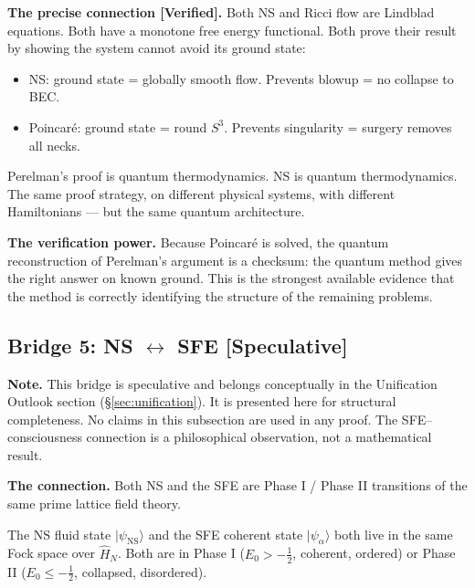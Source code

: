 \documentclass[12pt]{article}
\newcommand{\ket}[1]{|{#1}\rangle}
\newcommand{\half}{\tfrac{1}{2}}
\begin{document}
\begin{tcolorbox}[provedbox]
\textbf{The precise connection [Verified].}
Both NS and Ricci flow are Lindblad equations.
Both have a monotone free energy functional.
Both prove their result by showing the system cannot
avoid its ground state:
\begin{itemize}[itemsep=2pt]
  \item NS: ground state = globally smooth flow.
    Prevents blowup = no collapse to BEC.
  \item Poincar\'{e}: ground state = round $S^3$.
    Prevents singularity = surgery removes all necks.
\end{itemize}
Perelman's proof is quantum thermodynamics.
NS is quantum thermodynamics.
The same proof strategy, on different physical systems,
with different Hamiltonians --- but the same quantum architecture.
\end{tcolorbox}

\textbf{The verification power.}
Because Poincar\'{e} is solved, the quantum reconstruction of
Perelman's argument is a checksum:
the quantum method gives the right answer on known ground.
This is the strongest available evidence that the method
is correctly identifying the structure of the remaining problems.

\subsection{Bridge 5: NS $\longleftrightarrow$ SFE [Speculative]}
\label{sec:bridge-sfe}

\begin{tcolorbox}[colback=gray!8!white,colframe=gray!50!black]
\textbf{Note.} This bridge is speculative and belongs conceptually in the
Unification Outlook section (\S\ref{sec:unification}).
It is presented here for structural completeness.
No claims in this subsection are used in any proof.
The SFE--consciousness connection is a philosophical observation,
not a mathematical result.
\end{tcolorbox}

\textbf{The connection.}
Both NS and the SFE are Phase I / Phase II transitions of the same
prime lattice field theory.

The NS fluid state $\ket{\psi_{\mathrm{NS}}}$ and the SFE coherent state
$\ket{\psi_\alpha}$ both live in the same Fock space over $\hat{H}_N$.
Both are in Phase I ($E_0 > -\half$, coherent, ordered) or
Phase II ($E_0 \le -\half$, collapsed, disordered).
\end{document}
